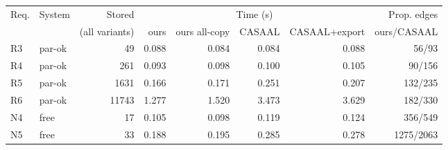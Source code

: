 \begin{adjustbox}{max width=\textwidth}\begin{tabular}{llrrrrrr}
\toprule
Req. & System & Stored & \multicolumn{4}{c}{Time (s)} & Prop. edges \\
\cmidrule(lr){4-7}
 & & (all variants) & ours & ours all-copy & CASAAL & CASAAL+export & ours/CASAAL \\
\midrule
R3 & par-ok & 49 & 0.088 & 0.084 & 0.084 & 0.088 & 56/93 \\
R4 & par-ok & 261 & 0.093 & 0.098 & 0.100 & 0.105 & 90/156 \\
R5 & par-ok & 1631 & 0.166 & 0.171 & 0.251 & 0.207 & 132/235 \\
R6 & par-ok & 11743 & 1.277 & 1.520 & 3.473 & 3.629 & 182/330 \\
N4 & free & 17 & 0.105 & 0.098 & 0.119 & 0.124 & 356/549 \\
N5 & free & 33 & 0.188 & 0.195 & 0.285 & 0.278 & 1275/2063 \\
\bottomrule
\end{tabular}\end{adjustbox}
